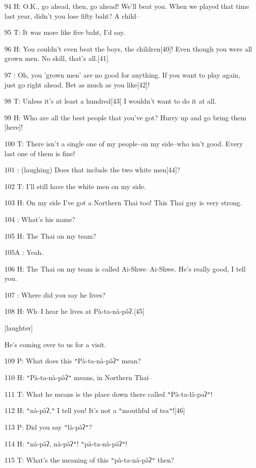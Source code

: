 94 H: O.K., go ahead, then, go ahead! We'll beat you. When we played that time
last year, didn't you lose fifty baht? A child--

95 T: It was more like five baht, I'd say.

96 H: You couldn't even beat the boys, the children[40]! Even though you were all
grown men. No skill, that's all.[41]

97    : Oh, you 'grown men' are no good for anything. If you want to play again,
just go right ahead. Bet as much as you like[42]!

98 T: Unless it's at least a hundred[43] I wouldn't want to do it at all.

99 H: Who are all the best people that you've got? Hurry up and go bring them [here]!

100 T: There isn't a single one of my people--on my side--who isn't good. Every
last one of them is fine!

101    : (laughing) Does that include the two white men[44]?

102 T: I'll still have the white men on my side.

103 H: On my side I've got a Northern Thai too! This Thai guy is very strong.

104    : What's his name?

105 H: The Thai on my team?

105A  : Yeah.

106 H: The Thai on my team is called Ai-Shwe--Ai-Shwe. He's really good, I tell
you.

107    : Where did you say he lives?

108 H: Wh--I hear he lives at Pà-ta-nà-pə̂ʔ.[45]

[laughter]

He's coming over to us for a visit.

109 P: What does this \texttt{"}Pà-ta-nà-pə̂ʔ\texttt{"} mean?

110 H: \texttt{"}Pà-ta-nà-pə̂ʔ\texttt{"} means, in Northern Thai--

111 T: What he means is the place down there called \texttt{"}Pà-ta-lâ-pəʔ\texttt{"}!

112 H: \texttt{"}nà-pə̂ʔ,\texttt{"} I tell you! It's not a \texttt{"}mouthful
of tea\texttt{"}![46]

113 P: Did you say \texttt{"}là-pə̂ʔ\texttt{"}?

114 H: \texttt{"}nà-pə̂ʔ, nà-pə̂ʔ\texttt{"}! \texttt{"}pà-ta-nà-pə̂ʔ\texttt{"}!

115 T: What's the meaning of this \texttt{"}pà-ta-nà-pə̂ʔ\texttt{"} then?


